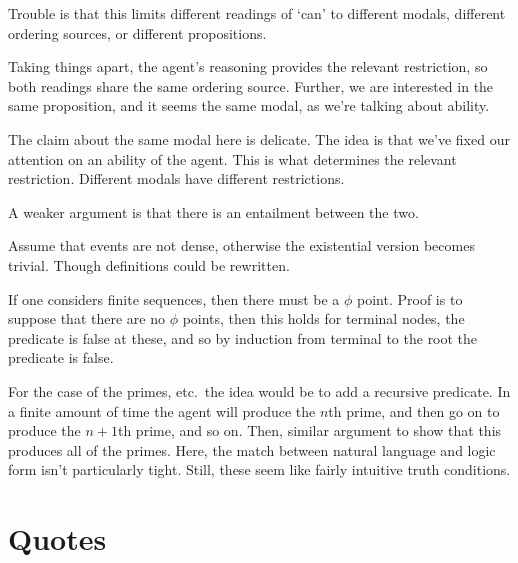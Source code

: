\documentclass[10pt]{article}
\begin{document}
Trouble is that this limits different readings of `can' to different modals, different ordering sources, or different propositions.

Taking things apart, the agent's reasoning provides the relevant restriction, so both readings share the same ordering source.
Further, we are interested in the same proposition, and it seems the same modal, as we're talking about ability.

The claim about the same modal here is delicate.
The idea is that we've fixed our attention on an ability of the agent.
This is what determines the relevant restriction.
Different modals have different restrictions.

A weaker argument is that there is an entailment between the two.





Assume that events are not dense, otherwise the existential version becomes trivial.
Though definitions could be rewritten.

If one considers finite sequences, then there must be a \(\phi\) point.
Proof is to suppose that there are no \(\phi\) points, then this holds for terminal nodes, the predicate is false at these, and so by induction from terminal to the root the predicate is false.

For the case of the primes, etc.\ the idea would be to add a recursive predicate.
In a finite amount of time the agent will produce the \(n\)th prime, and then go on to produce the \(n+1\)th prime, and so on.
Then, similar argument to show that this produces all of the primes.
Here, the match between natural language and logic form isn't particularly tight.
Still, these seem like fairly intuitive truth conditions.

\newpage

\section*{Quotes}
\label{sec:quotes}
\end{document}
